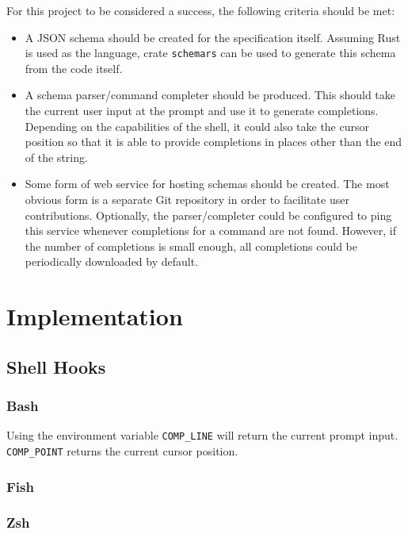 \documentclass[a4paper,10pt]{report}
\begin{document}
For this project to be considered a success, the following criteria should be met:
\begin{itemize}
 \item A JSON schema should be created for the specification itself. Assuming Rust is used as the language, crate \texttt{schemars} can be used to generate this schema from the code itself.
 \item A schema parser/command completer should be produced. This should take the current user input at the prompt and use it to generate completions. Depending on the capabilities of the shell, it could also take the cursor position so that it is able to provide completions in places other than the end of the string.
 \item Some form of web service for hosting schemas should be created. The most obvious form is a separate Git repository in order to facilitate user contributions. Optionally, the parser/completer could be configured to ping this service whenever completions for a command are not found. However, if the number of completions is small enough, all completions could be periodically downloaded by default.
\end{itemize}

\chapter{Implementation}

\section{Shell Hooks}

\subsection{Bash}

Using the environment variable \texttt{COMP\_LINE} will return the current prompt input. \texttt{COMP\_POINT} returns the current cursor position.

\subsection{Fish}

\subsection{Zsh}
\end{document}
